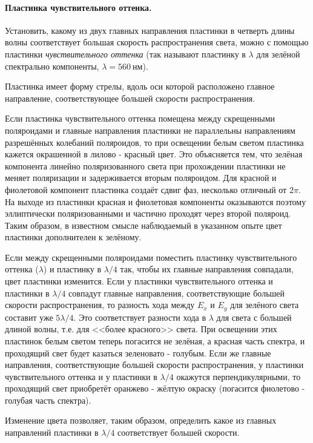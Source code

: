 \documentclass[a4paper, 12pt, twoside]{article}
\begin{document}
	 \paragraph{Пластинка чувствительного оттенка.} Установить, какому из двух главных направления пластинки в четверть длины волны соответствует большая скорость распространения света, можно с помощью пластинки \textit{чувствительного оттенка} (так называют пластинку в $\lambda$ для зелёной спектрально компоненты, $\lambda = 560 ~ \text{нм}$).
	 
	 Пластинка имеет форму стрелы, вдоль оси которой расположено главное направление, соответствующее большей скорости распространения.
	 
	 Если пластинка чувствительного оттенка помещена между скрещенными поляроидами и главные направления пластинки не параллельны направлениям разрешённых колебаний поляроидов, то при освещении белым светом пластинка кажется окрашенной в лилово - красный цвет. Это объясняется тем, что зелёная компонента линейно поляризованного света при прохождении пластинки не меняет поляризации и задерживается вторым поляроидом. Для красной и фиолетовой компонент пластинка создаёт сдвиг фаз, несколько отличный от $2\pi$. На выходе из пластинки красная и фиолетовая компоненты оказываются поэтому эллиптически поляризованными и частично проходят через второй поляроид. Таким образом, в известном смысле наблюдаемый в указанном опыте цвет пластинки дополнителен к зелёному.
	 
	 Если между скрещенными поляроидами поместить пластинку чувствительного оттенка ($\lambda$) и пластинку в $\lambda/4$ так, чтобы их главные направления совпадали, цвет пластинки изменится. Если у пластинки чувствительного оттенка и пластинки в $\lambda /4$ совпадут главные направления, соответствующие большей скорости распространения, то разность хода между $E_x$ и $E_y$ для зелёного света составит уже $5\lambda/4$. Это соответствует разности хода в $\lambda$ для света с большей длиной волны, т.е. для <<более красного>> света. При освещении этих пластинок белым светом теперь погасится не зелёная, а красная часть спектра, и проходящий свет будет казаться зеленовато - голубым. Если же главные направления, соответствующие большей скорости распространения, у пластинки чувствительного оттенка и у пластинки в $\lambda / 4$ окажутся перпендикулярными, то проходящий свет приобретёт оранжево - жёлтую окраску (погасится фиолетово - голубая часть спектра).
	 
	 Изменение цвета позволяет, таким образом, определить какое из главных направлений пластинки в $\lambda / 4$ соответствует большей скорости.
	 
\end{document}
